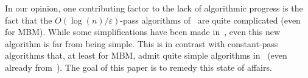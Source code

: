\documentclass{article}
\newcommand{\eps}{\varepsilon}
\begin{document}
In our opinion, one contributing factor to the lack of algorithmic progress is the fact that the $O(\log{\!(n)}/\eps)$-pass algorithms of~\cite{AhnG11b,AhnG15} are quite complicated (even for MBM). While some simplifications have been 
made in~\cite{AssadiJJST22}, even this new algorithm is far from being simple. This is in contrast with constant-pass algorithms that, at least for MBM, 
admit quite simple algorithms in~\cite{AssadiLT21} (even already from~\cite{AhnG11}). The goal of this paper is to remedy this state of affairs. 

\begin{table}[h!]

{\smaller
\begin{tabular}{|c | c | c | c | c | c | c |}


\end{tabular}}
\end{table}
\end{document}
